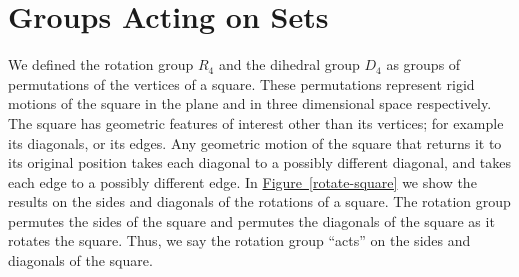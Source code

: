 \documentclass[10pt,]{book}
\theoremstyle{plain}
\theoremstyle{definition}
\theoremstyle{definition}
\numberwithin{equation}{chapter}
\begin{document}
\section[{Groups Acting on Sets}]{Groups Acting on Sets}\label{sec_groups-groupsact}
\hypertarget{p-1576}{}%
We defined the rotation group \(R_4\) and the dihedral group \(D_4\) as groups of permutations of the vertices of a square. These permutations represent rigid motions of the square in the plane and in three dimensional space respectively. The square has geometric features of interest other than its vertices; for example its diagonals, or its edges. Any geometric motion of the square that returns it to its original position takes each diagonal to a possibly different diagonal, and takes each edge to a possibly different edge. In \hyperref[rotate-square]{Figure~\ref{rotate-square}} we show the results on the sides and diagonals of the rotations of a square. The rotation group permutes the sides of the square and permutes the diagonals of the square as it rotates the square. Thus, we say the rotation group ``acts'' on the sides and diagonals of the square.%
\end{document}
